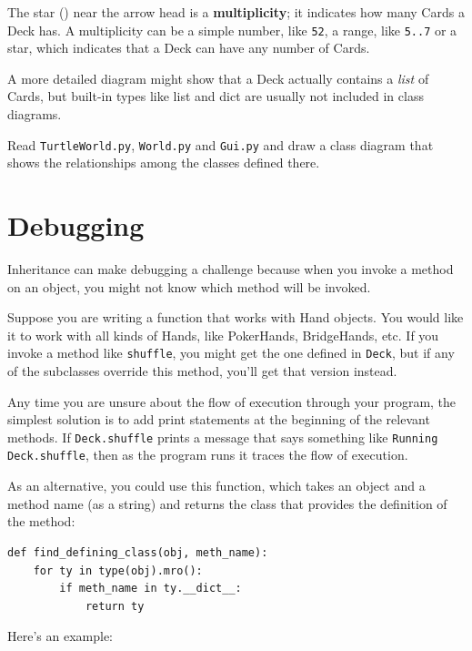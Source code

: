 \documentclass[10pt]{book}
\begin{document}
{

The star ({\tt *}) near the arrow head is a 
{\bf multiplicity}; it indicates how many Cards a Deck has.
A multiplicity can be a simple number, like {\tt 52}, a range,
like {\tt 5..7} or a star, which indicates that a Deck can
have any number of Cards.

A more detailed diagram might show that a Deck actually
contains a {\em list} of Cards, but built-in types
like list and dict are usually not included in class diagrams.

\begin{ex}
Read {\tt TurtleWorld.py}, {\tt World.py} and {\tt Gui.py}
and draw a class diagram that shows the relationships among
the classes defined there.
\end{ex}


\section{Debugging}

Inheritance can make debugging a challenge because when you
invoke a method on an object, you might not know which method
will be invoked.


Suppose you are writing a function that works with Hand objects.
You would like it to work with all kinds of Hands, like
PokerHands, BridgeHands, etc.  If you invoke a method like
{\tt shuffle}, you might get the one defined in {\tt Deck},
but if any of the subclasses override this method, you'll
get that version instead.  


Any time you are unsure about the flow of execution through your
program, the simplest solution is to add print statements at the
beginning of the relevant methods.  If {\tt Deck.shuffle} prints a
message that says something like {\tt Running Deck.shuffle}, then as
the program runs it traces the flow of execution.

As an alternative, you could use this function, which takes an
object and a method name (as a string) and returns the class that
provides the definition of the method:

\beforeverb
\begin{verbatim}
def find_defining_class(obj, meth_name):
    for ty in type(obj).mro():
        if meth_name in ty.__dict__:
            return ty
\end{verbatim}
\afterverb
%
Here's an example:

}
\end{document}
